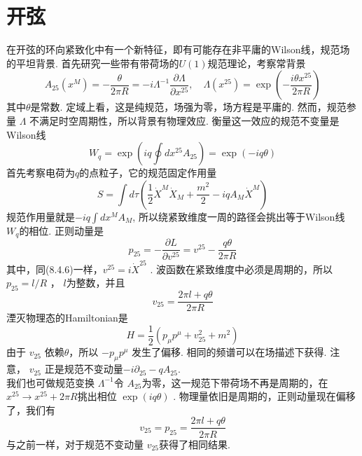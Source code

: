\section{开弦}%
在开弦的环向紧致化中有一个新特征，即有可能存在非平庸的Wilson线，规范场的平坦背景. 首先研究一些带有带荷场的$U(1)$规范理论，考察常背景
\begin{equation}
	A_{25}\left(x^{M}\right)=-\frac{\theta}{2 \pi R}=-i \Lambda^{-1} \frac{\partial \Lambda}{\partial x^{25}}, \quad \Lambda\left(x^{25}\right)=\exp \left(-\frac{i \theta x^{25}}{2 \pi R}\right)
\end{equation}
其中$\theta$是常数. 定域上看，这是纯规范，场强为零，场方程是平庸的. 然而，规范参量 $\Lambda$ 不满足时空周期性，所以背景有物理效应. 衡量这一效应的规范不变量是Wilson线
\begin{equation}
	W_{q}=\exp \left(i q \oint d x^{25} A_{25}\right)=\exp (-i q \theta)
\end{equation}
首先考察电荷为$q$的点粒子，它的规范固定作用量
\begin{equation}
	S=\int d \tau\left(\frac{1}{2} \dot{X}^{M} \dot{X}_{M}+\frac{m^{2}}{2}-i q A_{M} \dot{X}^{M}\right)
\end{equation}
规范作用量就是$-i q \int d x^{M} A_{M}$, 所以绕紧致维度一周的路径会挑出等于Wilson线 $W_{q} $的相位. 正则动量是
\begin{equation}
	p_{25}=-\frac{\partial L}{\partial v^{25}}=v^{25}-\frac{q \theta}{2 \pi R}
\end{equation}
其中，同(8.4.6)一样，$v^{25}=i \dot{X}^{25}$ . 波函数在紧致维度中必须是周期的，所以 $p_{25}=l / R$ ， $l$为整数，并且
\begin{equation}
	v_{25}=\frac{2 \pi l+q \theta}{2 \pi R}
\end{equation}
湮灭物理态的Hamiltonian是
\begin{equation}
	H=\frac{1}{2}\left(p_{\mu} p^{\mu}+v_{25}^{2}+m^{2}\right)
\end{equation}
由于 $v_{25}$ 依赖$\theta$，所以 $-p_{\mu} p^{\mu}$ 发生了偏移. 相同的频谱可以在场描述下获得. 注意， $v_{25}$ 正是规范不变动量$-i \partial_{25}-q A_{25}$.\\
我们也可做规范变换 $\Lambda^{-1}$令 $A_{25}$为零，这一规范下带荷场不再是周期的，在$x^{25} \rightarrow x^{25}+2 \pi R$挑出相位 $\exp (i q \theta)$ . 物理量依旧是周期的，正则动量现在偏移了，我们有
\begin{equation}
	v_{25}=p_{25}=\frac{2 \pi l+q \theta}{2 \pi R}
\end{equation}
与之前一样，对于规范不变动量 $v_{25}$获得了相同结果.\\
